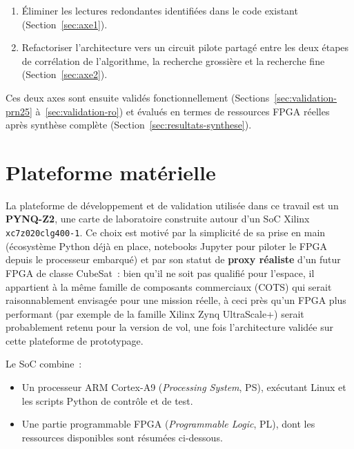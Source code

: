 \documentclass[11pt,a4paper]{article}
\providecommand{\og}{\guillemotleft{}}
\providecommand{\fg}{\guillemotright{}}
\begin{document}
\begin{enumerate}
  \item Éliminer les lectures redondantes identifiées dans le code existant (Section~\ref{sec:axe1}).
  \item Refactoriser l'architecture vers un \og circuit pilote \fg{} partagé entre les deux étapes de corrélation de l'algorithme, la recherche grossière et la recherche fine (Section~\ref{sec:axe2}).
\end{enumerate}

Ces deux axes sont ensuite validés fonctionnellement (Sections~\ref{sec:validation-prn25} à~\ref{sec:validation-ro}) et évalués en termes de ressources FPGA réelles après synthèse complète (Section~\ref{sec:resultats-synthese}).

\section{Plateforme matérielle}
\label{sec:plateforme}

La plateforme de développement et de validation utilisée dans ce travail est un \textbf{PYNQ-Z2}, une carte de laboratoire construite autour d'un SoC Xilinx \texttt{xc7z020clg400-1}. Ce choix est motivé par la simplicité de sa prise en main (écosystème Python déjà en place, notebooks Jupyter pour piloter le FPGA depuis le processeur embarqué) et par son statut de \textbf{proxy réaliste} d'un futur FPGA de classe CubeSat~: bien qu'il ne soit pas qualifié pour l'espace, il appartient à la même famille de composants commerciaux (COTS) qui serait raisonnablement envisagée pour une mission réelle, à ceci près qu'un FPGA plus performant (par exemple de la famille Xilinx Zynq UltraScale+) serait probablement retenu pour la version de vol, une fois l'architecture validée sur cette plateforme de prototypage.

Le SoC combine~:
\begin{itemize}
  \item Un processeur ARM Cortex-A9 (\textit{Processing System}, PS), exécutant Linux et les scripts Python de contrôle et de test.
  \item Une partie programmable FPGA (\textit{Programmable Logic}, PL), dont les ressources disponibles sont résumées ci-dessous.
\end{itemize}
\end{document}
